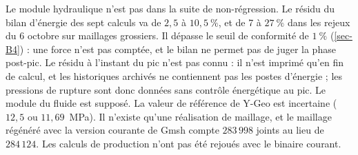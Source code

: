 Le module hydraulique n'est pas dans la suite de non-régression. Le résidu du bilan d'énergie des sept calculs va de $2{,}5$ à $10{,}5~\%$, et de 7 à $27~\%$ dans les rejeux du 6 octobre sur maillages grossiers. Il dépasse le seuil de conformité de $1~\%$ (\cref{sec-B4}) : une force n'est pas comptée, et le bilan ne permet pas de juger la phase post-pic. Le résidu à l'instant du pic n'est pas connu : il n'est imprimé qu'en fin de calcul, et les historiques archivés ne contiennent pas les postes d'énergie ; les pressions de rupture sont donc données sans contrôle énergétique au pic. Le module du fluide est supposé. La valeur de référence de Y-Geo est incertaine ($12{,}5$ ou $11{,}69$~MPa). Il n'existe qu'une réalisation de maillage, et le maillage régénéré avec la version courante de Gmsh compte $283\,998$ joints au lieu de $284\,124$. Les calculs de production n'ont pas été rejoués avec le binaire courant.
